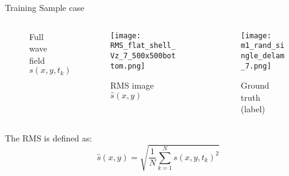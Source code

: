 \documentclass[10pt,aspectratio=169,dvipsnames]{beamer} %
\begin{document}
	\begin{frame}{Training Sample case}
		\begin{columns}[T]
			\begin{column}[c]{.32\textwidth}
				\begin{figure}
					\centering
					\caption{Full wavefield $s(x,y,t_k)$}
				\end{figure}
			\end{column}
			\begin{column}[c]{.32\textwidth}
				\begin{figure}
					\centering
					\texttt{[image: RMS\_flat\_shell\_Vz\_7\_500x500bottom.png]}
					\caption{RMS image $\hat{s}(x,y)$}
				\end{figure}
			\end{column}
			\begin{column}[c]{.32\textwidth}
				\begin{figure}
					\centering
					\texttt{[image: m1\_rand\_single\_delam\_7.png]}
					\caption{Ground truth (label)}
				\end{figure}
			\end{column}
		\end{columns}
		The RMS is defined as:
		\begin{equation*}
			\hat{s}(x,y) = \sqrt{\frac{1}{N}\sum_{k=1}^{N}s(x,y,t_k)^2} 
			\label{eqn:rms} 
		\end{equation*}
	\end{frame}
	\setcounter{subfigure}{0}
\end{document}
